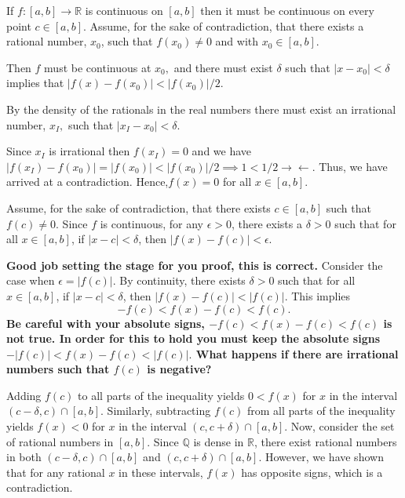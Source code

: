 \documentclass{report}
\begin{document}
\pagebreak
{}
\begin{myproof}
    

If $f:[a, b] \rightarrow \mathbb{R}$ is continuous on $[a, b]$ then it must be continuous on every point $c \in [a,b].$ Assume, for the sake of contradiction, that there exists a rational number, $x_0$, such that $f(x_0) \not =0 $ and with $x_0 \in [a,b]$.

Then $f$ must be continuous at $x_0,$ and there must exist $\delta$ such that $|x-x_0| < \delta$ implies that $|f(x) - f(x_0)| < |f(x_0)|/2.$ 

By the density of the rationals in the real numbers there must exist an irrational number, $x_I,$ such that $|x_I - x_0| < \delta.$ 

Since $x_I$ is irrational then $f(x_I) = 0$ and we have $|f(x_I) - f(x_0)| =  |f(x_0)| < \left|f(x_0)\right|/2 \implies 1 < 1/2 \rightarrow\!\leftarrow.$  Thus, we have arrived at a contradiction. Hence,$f(x)=0$ for all $x \in[a, b].$

\end{myproof}

Assume, for the sake of contradiction, that there exists $c \in[a, b]$ such that $f(c) \neq 0$. Since $f$ is continuous, for any $\epsilon>0$, there exists a $\delta>0$ such that for all $x \in[a, b]$, if $|x-c|<\delta$, then $|f(x)-f(c)|<\epsilon$.


\textbf{Good job setting the stage for you proof, this is correct.}
Consider the case when $\epsilon=|f(c)|$. By continuity, there exists $\delta>0$ such that for all $x \in[a, b]$, if $|x-c|<\delta$, then $|f(x)-f(c)|<|f(c)|$. This implies
$$
-f(c)<f(x)-f(c)<f(c) .
$$
\textbf{Be careful with your absolute signs, $-f(c)<f(x)-f(c)<f(c)$ is not true. In order for this to hold you must keep the absolute signs $-|f(c)|<f(x)-f(c)<|f(c)|.$ What happens if there are irrational numbers such that $f(c)$ is negative?
}
\bigskip\par
Adding $f(c)$ to all parts of the inequality yields $0<f(x)$ for $x$ in the interval $(c-\delta, c) \cap[a, b]$. Similarly, subtracting $f(c)$ from all parts of the inequality yields $f(x)<0$ for $x$ in the interval $(c, c+\delta) \cap[a, b]$. Now, consider the set of rational numbers in $[a, b]$. Since $\mathbb{Q}$ is dense in $\mathbb{R}$, there exist rational numbers in both $(c-\delta, c) \cap[a, b]$ and $(c, c+\delta) \cap[a, b]$. However, we have shown that for any rational $x$ in these intervals, $f(x)$ has opposite signs, which is a contradiction.
\end{document}
